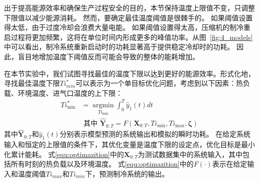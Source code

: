 出于提高能源效率和确保生产过程安全的目的，本节保持温度上限值不变，只调整下限值以减少能源消耗。
然而，要确定最佳温度阈值是很棘手的。
如果阈值设置得太低，由于过度冷却会浪费大量电能。
如果阈值设置得太高，压缩机的制冷重启过程将更加频繁，这将在单位时间内形成更多的峰值功率。从图~\ref{fig:4_models}中可以看出，制冷系统重新启动时的功耗显著高于提供稳定冷却时的功耗。
因此，盲目地增加温度下阈值反而可能会导致的整体的能耗增加。

在本节实验中，我们试图寻找最佳的温度下限以达到更好的能源效率。形式化地，寻找最佳温度下限$Ti_{min}^{*}$可以表示为一个单目标优化问题，考虑到以下因素：热负载、环境温度、进气口温度的上下限：
\begin{equation}
    \begin{aligned}
       Ti^*_{\min}&=\mathop{\arg\min}\limits_{Ti_{\min}} \int_{0}^{T} \hat{y}_{1}(t) dt \\
       &\text{ 其中 } \hat{\boldsymbol{Y}}_{0: T}=F\left(\boldsymbol{X}_{0: T},Ti_{\min}, Ti_{\max},\boldsymbol{\zeta}\right)
    \end{aligned}
    \label{equ:optimazition}
    \end{equation}
其中$\hat{\boldsymbol{Y}}_{0: T}$和$\hat{y}_{1}(t)$分别表示模型预测的系统输出和模拟的瞬时功耗。
在给定系统输入和恒定的上限值的条件下，其优化变量是温度下限的设定点，优化目标是最小化累计能耗。
式\eqref{equ:optimazition}中的$\boldsymbol{X}_{0: T}$为测试数据集中的系统输入，其中包括所有时刻的热负载以及环境温度。
式\eqref{equ:optimazition}中的$F(\cdot)$表示在给定输入和温度阈值$Ti_{max}$和$Ti_{min}$下，预测制冷系统的输出。


